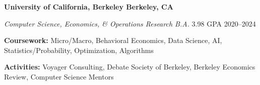 \textbf{University of California, Berkeley \hfill Berkeley, CA} \par
\textit{Computer Science, Economics, \& Operations Research B.A.} 3.98 GPA \hfill 2020--2024\par
\textbf{Coursework:} Micro/Macro, Behavioral Economics, Data Science, AI, Statistics/Probability, Optimization, Algorithms\par
\textbf{Activities:} Voyager Consulting, Debate Society of Berkeley, Berkeley Economics Review, Computer Science Mentors